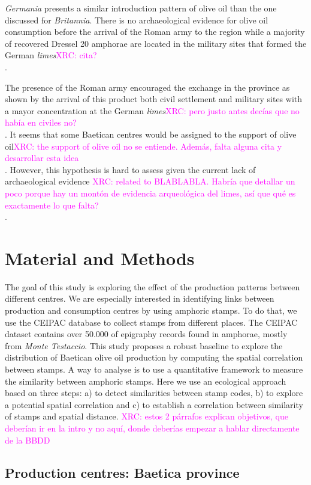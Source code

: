 \documentclass[review]{elsarticle}
\newcommand{\memo}[2]{\textcolor{#1}{#2}}
\newcommand{\xavi}[1]{\memo{magenta}{XRC: #1\\}}
\begin{document}
\textit{Germania} presents a similar introduction pattern of olive oil than the one discussed for \textit{Britannia}. There is no archaeological evidence for olive oil consumption before the arrival of the Roman army to the region while a majority of recovered Dressel 20 amphorae are located in the military sites that formed the German \textit{limes}\xavi{cita?}. 

The presence of the Roman army encouraged the exchange in the province as shown by the arrival of this product both civil settlement and military sites with a mayor concentration at the German \textit{limes}\xavi{pero justo antes decías que no había en civiles no?}. It seems that some Baetican centres would be assigned to the support of olive oil\xavi{the support of olive oil no se entiende. Además, falta alguna cita y desarrollar esta idea}. However, this hypothesis is hard to assess given the current lack of archaeological evidence \xavi{related to BLABLABLA. Habría que detallar un poco porque hay un montón de evidencia arqueológica del limes, así que qué es exactamente lo que falta?}\citep[125]{remesal_concierto}. 



\section{Material and Methods}


The goal of this study is exploring the effect of the production patterns between different centres. We are especially interested in identifying links between production and consumption centres by using amphoric stamps. To do that, we use the CEIPAC database to collect stamps from different places. The CEIPAC dataset contains over 50.000 of epigraphy records found in amphorae, mostly from \textit{Monte Testaccio}.
This study proposes a robust baseline to explore the distribution of Baetican olive oil production by computing the spatial correlation between stamps. A way to analyse is to use a quantitative framework to measure the similarity between amphoric stamps. Here we use an ecological approach based on three steps: a) to detect similarities between stamp codes, b) to explore a potential spatial correlation and c) to establish a correlation between similarity of stamps and spatial distance. 
\xavi{estos 2 párrafos explican objetivos, que deberían ir en la intro y no aquí, donde deberías empezar a hablar directamente de la BBDD}


\subsection{Production centres: Baetica province}
\end{document}
